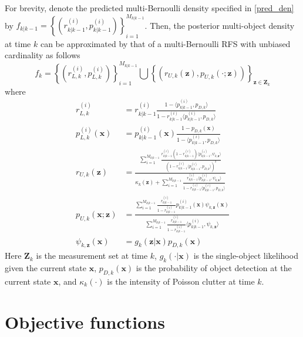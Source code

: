 \documentclass[twocolumn]{autart}
\begin{document}
For brevity, denote the predicted multi-Bernoulli density specified in \eqref{pred_den} by $f_{k|k-1}=\left\{ \left( r_{k|k-1}^{(i)},p_{k|k-1}^{(i)}\right) \right\}
_{i=1}^{M_{k|k-1}}$. Then, the posterior multi-object density at time $k$ can be approximated by
that of a multi-Bernoulli RFS with unbiased cardinality as follows
\begin{equation}
f_{k}=\left\{ \left( r_{L,k}^{(i)},p_{L,k}^{(i)}\right) \right\}
_{i=1}^{M_{k|k-1}}\bigcup \left\{ \left( r_{U,k}(\mathbf{z}),p_{U,k}(\cdot ;\mathbf{z})\right) \right\} _{\mathbf{z}\in \mathbf{Z}_{k}}  \label{upd_den}
\end{equation}where
\begin{align}
r_{L,k}^{(i)}& =r_{k|k-1}^{(i)}\frac{1-\langle
p_{k|k-1}^{(i)},p_{D,k}\rangle }{1-r_{k|k-1}^{(i)}\langle
p_{k|k-1}^{(i)},p_{D,k}\rangle }  \label{MeMBer:upd1} \\
p_{L,k}^{(i)}(\mathbf{x})& =p_{k|k-1}^{(i)}(\mathbf{x})\frac{1-p_{D,k}(\mathbf{x})}{1-\langle p_{k|k-1}^{(i)},p_{D,k}\rangle } \\
r_{U,k}(\mathbf{z})& =\frac{\sum_{i=1}^{M_{k|k-1}}\frac{r_{k|k-1}^{(i)}(1-r_{k|k-1}^{(i)})\langle p_{k|k-1}^{(i)},\psi _{k,\mathbf{z}}\rangle }{\left( 1-r_{k|k-1}^{(i)}\langle p_{k|k-1}^{(i)},p_{D,k}\rangle
\right) ^{2}}}{\kappa _{k}(\mathbf{z})+\sum_{i=1}^{M_{k|k-1}}\frac{r_{k|k-1}^{(i)}\langle p_{k|k-1}^{(i)},\psi _{k,\mathbf{z}}\rangle }{1-r_{k|k-1}^{(i)}\langle p_{k|k-1}^{(i)},p_{D,k}\rangle }} \\
p_{U,k}(\mathbf{x};\mathbf{z})& =\frac{\sum_{i=1}^{M_{k|k-1}}\frac{r_{k|k-1}^{(i)}}{1-r_{k|k-1}^{(i)}}p_{k|k-1}^{(i)}(\mathbf{x})\psi _{k,\mathbf{z}}(\mathbf{x})}{\sum_{i=1}^{M_{k|k-1}}\frac{r_{k|k-1}^{(i)}}{1-r_{k|k-1}^{(i)}}\langle p_{k|k-1}^{(i)},\psi _{k,\mathbf{z}}\rangle } \\
\psi _{k,\mathbf{z}}(\mathbf{x})& =g_{k}(\mathbf{z}|\mathbf{x})p_{D,k}(\mathbf{x})  \label{MeMBer:upd2}
\end{align}Here $\mathbf{Z}_{k}$ is the measurement set at time $k$, $g_{k}(\cdot |\mathbf{x})$ is the single-object likelihood given the current state $\mathbf{x}$, $p_{D,k}(\mathbf{x})$ is the probability of object detection at
the current state $\mathbf{x}$, and $\kappa _{k}(\cdot {})$ is the intensity
of Poisson clutter at time $k$.



\section{Objective functions}
\end{document}
